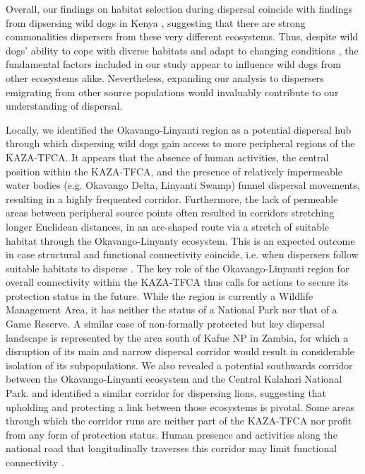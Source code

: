 \documentclass[abstract=on,10pt,a4paper,bibliography=totocnumbered]{article}
\begin{document}
Overall, our findings on habitat selection during dispersal coincide with
findings from dipsersing wild dogs in Kenya \citep{Oneill.2020}, suggesting that
there are strong commonalities dispersers from these very different ecosystems.
Thus, despite wild dogs' ability to cope with diverse habitats and adapt to
changing conditions \citep{Woodroffe.2011}, the fundamental factors included in
our study appear to influence wild dogs from other ecosystems alike.
Nevertheless, expanding our analysis to dispersers emigrating from other source
populations would invaluably contribute to our understanding of
dispersal.

Locally, we identified the Okavango-Linyanti region as a potential dispersal hub
through which dispersing wild dogs gain access to more peripheral regions of the
KAZA-TFCA. It appears that the absence of human activities, the central position
within the KAZA-TFCA, and the presence of relatively impermeable water bodies
(e.g. Okavango Delta, Linyanti Swamp) funnel dispersal movements, resulting in a
highly frequented corridor. Furthermore, the lack of permeable areas between
peripheral source points often resulted in corridors stretching longer Euclidean
distances, in an arc-shaped route via a stretch of suitable habitat through the
Okavango-Linyanty ecosystem. This is an expected outcome in case structural and
functional connectivity coincide, i.e. when dispersers follow suitable habitats
to disperse \citep{Fattebert.2015, Hauenstein.2019}. The
key role of the Okavango-Linyanti region for overall connectivity within the
KAZA-TFCA thus calls for actions to secure its protection status in the future.
While the region is currently a Wildlife Management Area, it has neither the
status of a National Park nor that of a Game Reserve. A similar case of
non-formally protected but key dispersal landscape is represented by the area
south of Kafue NP in Zambia, for which a disruption of its main and narrow
dispersal corridor would result in considerable isolation of its subpopulations.
We also revealed a potential southwards corridor between the Okavango-Linyanti
ecosystem and the Central Kalahari National Park. \cite{Elliot.2014} and
\cite{Cushman.2018} identified a similar corridor for dispersing lions,
suggesting that upholding and protecting a link between those ecosystems is
pivotal. Some areas through which the corridor runs are neither part of the
KAZA-TFCA nor profit from any form of protection status. Human presence and
activities along the national road that longitudinally traverses this corridor
may limit functional connectivity \citep{Cozzi.2020}.
\end{document}

